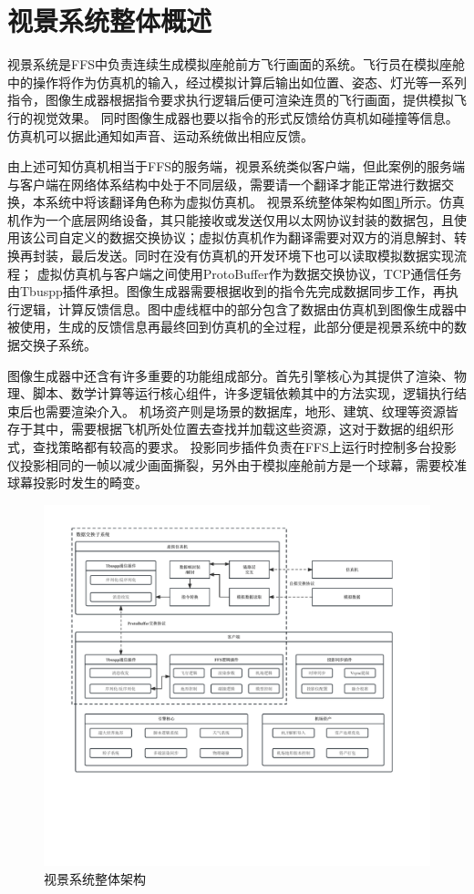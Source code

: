 \section{视景系统整体概述}
视景系统是FFS中负责连续生成模拟座舱前方飞行画面的系统。飞行员在模拟座舱中的操作将作为仿真机的输入，经过模拟计算后输出如位置、姿态、灯光等一系列指令，图像生成器根据指令要求执行逻辑后便可渲染连贯的飞行画面，提供模拟飞行的视觉效果。
同时图像生成器也要以指令的形式反馈给仿真机如碰撞等信息。仿真机可以据此通知如声音、运动系统做出相应反馈。
\par
由上述可知仿真机相当于FFS的服务端，视景系统类似客户端，但此案例的服务端与客户端在网络体系结构中处于不同层级，需要请一个翻译才能正常进行数据交换，本系统中将该翻译角色称为虚拟仿真机。
视景系统整体架构如图\ref{framework}所示。仿真机作为一个底层网络设备，其只能接收或发送仅用以太网协议封装的数据包，且使用该公司自定义的数据交换协议；虚拟仿真机作为翻译需要对双方的消息解封、转换再封装，最后发送。同时在没有仿真机的开发环境下也可以读取模拟数据实现流程；
虚拟仿真机与客户端之间使用ProtoBuffer作为数据交换协议，TCP通信任务由Tbuspp插件承担。图像生成器需要根据收到的指令先完成数据同步工作，再执行逻辑，计算反馈信息。图中虚线框中的部分包含了数据由仿真机到图像生成器中被使用，生成的反馈信息再最终回到仿真机的全过程，此部分便是视景系统中的数据交换子系统。
\par
图像生成器中还含有许多重要的功能组成部分。首先引擎核心为其提供了渲染、物理、脚本、数学计算等运行核心组件，许多逻辑依赖其中的方法实现，逻辑执行结束后也需要渲染介入。
机场资产则是场景的数据库，地形、建筑、纹理等资源皆存于其中，需要根据飞机所处位置去查找并加载这些资源，这对于数据的组织形式，查找策略都有较高的要求。
投影同步插件负责在FFS上运行时控制多台投影仪投影相同的一帧以减少画面撕裂，另外由于模拟座舱前方是一个球幕，需要校准球幕投影时发生的畸变。

\begin{figure}[h]
    \begin{center}
        \includegraphics[width=\textwidth]{pictures/sketch.pdf}
        \caption{视景系统整体架构}
        \label{framework}
    \end{center}
\end{figure}

